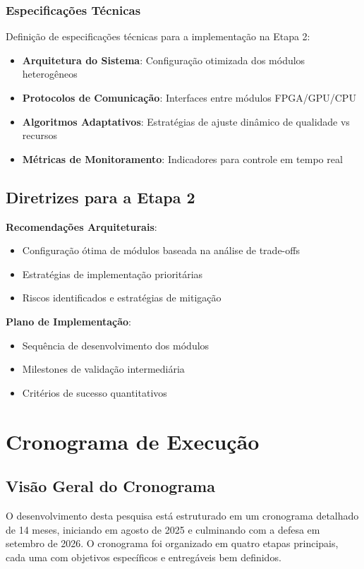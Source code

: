 \subsubsection{Especificações Técnicas}

Definição de especificações técnicas para a implementação na Etapa 2:
\begin{itemize}
\item \textbf{Arquitetura do Sistema}: Configuração otimizada dos módulos heterogêneos
\item \textbf{Protocolos de Comunicação}: Interfaces entre módulos FPGA/GPU/CPU
\item \textbf{Algoritmos Adaptativos}: Estratégias de ajuste dinâmico de qualidade vs recursos
\item \textbf{Métricas de Monitoramento}: Indicadores para controle em tempo real
\end{itemize}

\subsection{Diretrizes para a Etapa 2}

\textbf{Recomendações Arquiteturais}:
\begin{itemize}
\item Configuração ótima de módulos baseada na análise de trade-offs
\item Estratégias de implementação prioritárias
\item Riscos identificados e estratégias de mitigação
\end{itemize}

\textbf{Plano de Implementação}:
\begin{itemize}
\item Sequência de desenvolvimento dos módulos
\item Milestones de validação intermediária
\item Critérios de sucesso quantitativos
\end{itemize}

\section{Cronograma de Execução}

\subsection{Visão Geral do Cronograma}

O desenvolvimento desta pesquisa está estruturado em um cronograma detalhado de 14 meses, iniciando em agosto de 2025 e culminando com a defesa em setembro de 2026. O cronograma foi organizado em quatro etapas principais, cada uma com objetivos específicos e entregáveis bem definidos.

